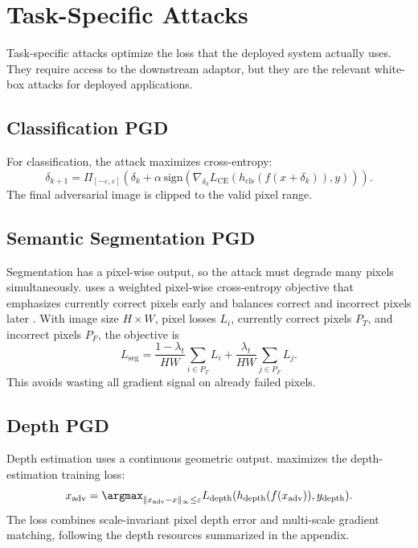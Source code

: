 \section{Task-Specific Attacks}

Task-specific attacks optimize the loss that the deployed system actually uses. They require access to the downstream adaptor, but they are the relevant white-box attacks for deployed applications.

\subsection{Classification PGD}

For classification, the attack maximizes cross-entropy:
\begin{equation}
    \delta_{k+1}=\Pi_{[-\varepsilon,\varepsilon]}
    \left(\delta_k + \alpha\,\mathrm{sign}\left(
    \nabla_{\delta_k} L_{\mathrm{CE}}(h_{\mathrm{cls}}(f(x+\delta_k)),y)
    \right)\right).
    \label{eq:classification-pgd}
\end{equation}
The final adversarial image is clipped to the valid pixel range.

\subsection{Semantic Segmentation PGD}

Segmentation has a pixel-wise output, so the attack must degrade many pixels simultaneously. \SegPGD uses a weighted pixel-wise cross-entropy objective that emphasizes currently correct pixels early and balances correct and incorrect pixels later \parencite{gu2022segpgd}. With image size $H\times W$, pixel losses $L_i$, currently correct pixels $P_T$, and incorrect pixels $P_F$, the objective is
\begin{equation}
    L_{\mathrm{seg}}=
    \frac{1-\lambda_t}{HW}\sum_{i\in P_T} L_i
    +
    \frac{\lambda_t}{HW}\sum_{j\in P_F} L_j.
    \label{eq:segpgd}
\end{equation}
This avoids wasting all gradient signal on already failed pixels.

\subsection{Depth PGD}

Depth estimation uses a continuous geometric output. \DepthPGD maximizes the depth-estimation training loss:
\begin{equation}
    x_{\mathrm{adv}}=
    \argmax_{\lVert x_{\mathrm{adv}}-x\rVert_\infty\leq\varepsilon}
    L_{\mathrm{depth}}(h_{\mathrm{depth}}(f(x_{\mathrm{adv}})), y_{\mathrm{depth}}).
    \label{eq:depthpgd}
\end{equation}
The loss combines scale-invariant pixel depth error and multi-scale gradient matching, following the depth resources summarized in the appendix.

